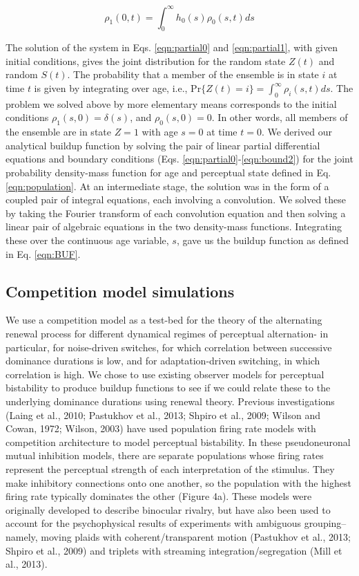 \begin{equation}
\rho_1(0,t) = \int_0^{\infty} h_0(s) \rho_0(s,t) ds
\label{eqn:bound2}
\end{equation}

The solution of the system in Eqs. \ref{eqn:partial0} and \ref{eqn:partial1}, with given initial conditions, gives the joint distribution for the random state $Z(t)$ and random $S(t)$. The probability that a member of the ensemble is in state $i$ at time $t$ is given by integrating over age, i.e., Pr$\{Z(t)=i\}=\int_0^\infty\rho_i (s,t) ds$. The problem we solved above by more elementary means corresponds to the initial conditions $\rho_1 (s,0)=\delta(s)$, and $\rho_0 (s,0)=0$. In other words, all members of the ensemble are in state $Z=1$ with age $s=0$ at time $t=0$. We derived our analytical buildup function by solving the pair of linear partial differential equations and boundary conditions (Eqs. \ref{eqn:partial0}-\ref{eqn:bound2}) for the joint probability density-mass function for age and perceptual state defined in Eq. \ref{eqn:population}. At an intermediate stage, the solution was in the form of a coupled pair of integral equations, each involving a convolution. We solved these by taking the Fourier transform of each convolution equation and then solving a linear pair of algebraic equations in the two density-mass functions. Integrating these over the continuous age variable, $s$, gave us the buildup function as defined in Eq. \ref{eqn:BUF}.

\subsection{Competition model simulations}

We use a competition model as a test-bed for the theory of the alternating renewal process for different dynamical regimes of perceptual alternation- in particular, for noise-driven switches, for which correlation between successive dominance durations is low, and for adaptation-driven switching, in which correlation is high. We chose to use existing observer models for perceptual bistability to produce buildup functions to see if we could relate these to the underlying dominance durations using renewal theory. Previous investigations (Laing et al., 2010; Pastukhov et al., 2013; Shpiro et al., 2009; Wilson and Cowan, 1972; Wilson, 2003) have used population firing rate models with competition architecture to model perceptual bistability. In these pseudoneuronal mutual inhibition models, there are separate populations whose firing rates represent the perceptual strength of each interpretation of the stimulus. They make inhibitory connections onto one another, so the population with the highest firing rate typically dominates the other (Figure 4a). These models were originally developed to describe binocular rivalry, but have also been used to account for the psychophysical results of experiments with ambiguous grouping– namely, moving plaids with coherent/transparent motion (Pastukhov et al., 2013; Shpiro et al., 2009) and triplets with streaming integration/segregation (Mill et al., 2013).

